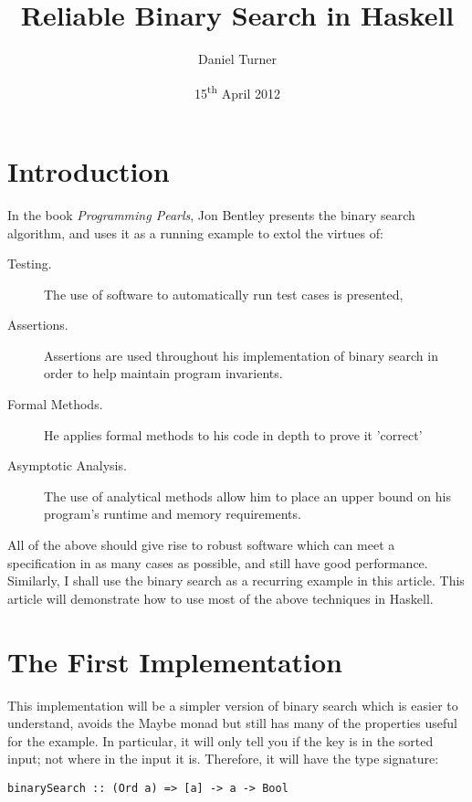 \documentclass{article}
\begin{document}
\lstset{language=Haskell}

\title{Reliable Binary Search in Haskell}
\author{Daniel Turner}
\date{15\textsuperscript{th} April 2012}
\maketitle

\section{Introduction}

In the book \emph{Programming Pearls}, Jon Bentley presents the binary search algorithm, and uses it as a running example to extol the virtues of:

\begin{description}
  \item[Testing.] The use of software to automatically run test cases is presented,
  \item[Assertions.] Assertions are used throughout his implementation of binary search in order to help maintain program invarients.
  \item[Formal Methods.] He applies formal methods to his code in depth to prove it 'correct'
  \item[Asymptotic Analysis.] The use of analytical methods allow him to place an upper bound on his program's runtime and memory requirements.
\end{description}

All of the above should give rise to robust software which can meet a specification in as many cases as possible, and still have good performance. Similarly, I shall use the binary search as a recurring example in this article. This article will demonstrate how to use most of the above techniques in Haskell.

\section{The First Implementation} 

This implementation will be a simpler version of binary search which is easier to understand, avoids the Maybe monad but still has many of the properties useful for the example. In particular, it will only tell you if the key is in the sorted input; not where in the input it is. Therefore, it will have the type signature:

\begin{lstlisting}
binarySearch :: (Ord a) => [a] -> a -> Bool
\end{lstlisting}
\end{document}
